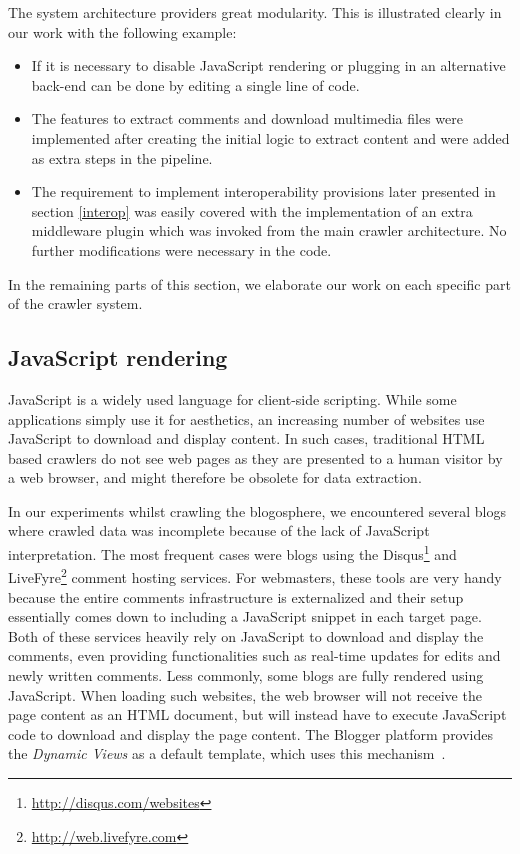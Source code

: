 The system architecture providers great modularity. This is illustrated 
clearly in our work with the following
example:

\begin{itemize}
\item 
If it is necessary to disable JavaScript rendering or plugging in an 
alternative back-end can be done by editing a single line of code. 
\item The features to extract comments and download multimedia files 
were implemented after creating the initial logic to extract content 
and were added as extra steps in the pipeline.
\item The requirement to implement interoperability provisions later 
presented in section \ref{interop} was easily covered with the implementation 
of an extra middleware plugin which was invoked from the main crawler 
architecture. No further modifications were necessary in the code.
\end{itemize}


In the remaining parts of this section, we elaborate our work on each 
specific part of the crawler system.

\subsection{JavaScript rendering}

JavaScript is a widely used language for client-side scripting. 
While some applications simply use it for aesthetics, an increasing 
number of websites use JavaScript to download and display content. 
In such cases, traditional HTML based crawlers do not see web pages 
as they are presented to a human visitor by a web browser, and might 
therefore be obsolete for data extraction.

In our experiments whilst crawling the blogosphere, we encountered 
several blogs where crawled data was incomplete because of the lack 
of JavaScript interpretation. The most frequent cases were blogs using 
the Disqus\footnote{\url{http://disqus.com/websites}} and 
LiveFyre\footnote{\url{http://web.livefyre.com}} comment hosting services. 
For webmasters, these tools are very handy because the entire comments 
infrastructure is externalized and their setup essentially comes down 
to including a JavaScript snippet in each target page. Both of these 
services heavily rely on JavaScript to download and display the comments, 
even providing functionalities such as real-time updates for edits and 
newly written comments. Less commonly, some blogs are fully rendered 
using JavaScript. When loading such websites, the web browser will not 
receive the page content as an HTML document, but will instead have 
to execute JavaScript code to download and display the page content. 
The Blogger platform provides the \emph{Dynamic Views} as a default 
template, which uses this mechanism~\cite{antinharasymiv2011}.

